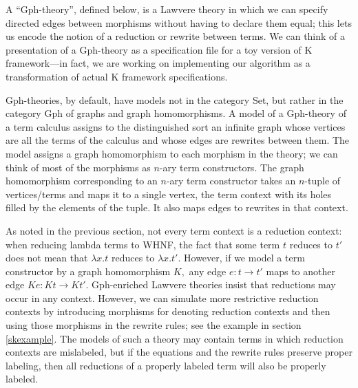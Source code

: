 \documentclass[submission,copyright,creativecommons]{eptcs}
\newcommand{\maps}{\colon}
\begin{document}
A ``Gph-theory'', defined below, is a Lawvere theory in which we can specify directed edges between morphisms without having to declare them equal; this lets us encode the notion of a reduction or rewrite between terms.  We can think of a presentation of a Gph-theory as a specification file for a toy version of K framework---in fact, we are working on implementing our algorithm as a transformation of actual K framework specifications.

Gph-theories, by default, have models not in the category Set, but rather in the category Gph of graphs and graph homomorphisms.  A model of a Gph-theory of a term calculus assigns to the distinguished sort an infinite graph whose vertices are all the terms of the calculus and whose edges are rewrites between them.  The model assigns a graph homomorphism to each morphism in the theory; we can think of most of the morphisms as $n\mbox{-}$ary term constructors.  The graph homomorphism corresponding to an $n\mbox{-}$ary term constructor takes an $n\mbox{-}$tuple of vertices/terms and maps it to a single vertex, the term context with its holes filled by the elements of the tuple.  It also maps edges to rewrites in that context.

As noted in the previous section, not every term context is a reduction context: when reducing lambda terms to WHNF, the fact that some term $t$ reduces to $t'$ does not mean that $\lambda x.t$ reduces to $\lambda x.t'.$  However, if we model a term constructor by a graph homomorphism $K,$ any edge $e\maps t \to t'$ maps to another edge $Ke\maps Kt \to Kt'.$  Gph-enriched Lawvere theories insist that reductions may occur in any context.  However, we can simulate more restrictive reduction contexts by introducing morphisms for denoting reduction contexts and then using those morphisms in the rewrite rules; see the example in section \ref{skexample}.  The models of such a theory may contain terms in which reduction contexts are mislabeled, but if the equations and the rewrite rules preserve proper labeling, then all reductions of a properly labeled term will also be properly labeled.
\end{document}
